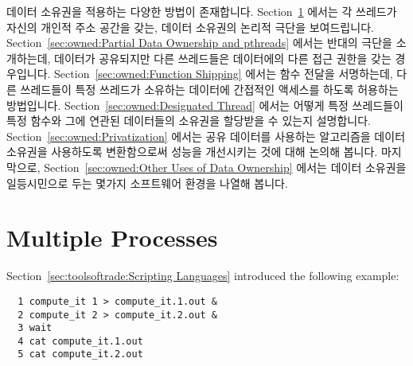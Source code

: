 데이터 소유권을 적용하는 다양한 방법이 존재합니다.
Section~\ref{sec:owned:Multiple Processes} 에서는 각 쓰레드가 자신의 개인적
주소 공간을 갖는, 데이터 소유권의 논리적 극단을 보여드립니다.
Section~\ref{sec:owned:Partial Data Ownership and pthreads} 에서는 반대의
극단을 소개하는데, 데이터가 공유되지만 다른 쓰레드들은 데이터에의 다른 접근
권한을 갖는 경우입니다.
Section~\ref{sec:owned:Function Shipping} 에서는 함수 전달을 서명하는데, 다른
쓰레드들이 특정 쓰레드가 소유하는 데이터에 간접적인 액세스를 하도록 허용하는
방법입니다.
Section~\ref{sec:owned:Designated Thread} 에서는 어떻게 특정 쓰레드들이 특정
함수와 그에 연관된 데이터들의 소유권을 할당받을 수 있는지 설명합니다.
Section~\ref{sec:owned:Privatization} 에서는 공유 데이터를 사용하는 알고리즘을
데이터 소유권을 사용하도록 변환함으로써 성능을 개선시키는 것에 대해 논의해
봅니다.
마지막으로, Section~\ref{sec:owned:Other Uses of Data Ownership} 에서는 데이터
소유권을 일등시민으로 두는 몇가지 소프트웨어 환경을 나열해 봅니다.
\iffalse

There are a number of approaches to data ownership.
Section~\ref{sec:owned:Multiple Processes} presents the logical extreme
in data ownership, where each thread has its own private address space.
Section~\ref{sec:owned:Partial Data Ownership and pthreads} looks at
the opposite extreme, where the data is shared, but different threads
own different access rights to the data.
Section~\ref{sec:owned:Function Shipping} describes function shipping,
which is a way of allowing other threads to have indirect access to
data owned by a particular thread.
Section~\ref{sec:owned:Designated Thread} describes how designated
threads can be assigned ownership of a specified function and the
related data.
Section~\ref{sec:owned:Privatization} discusses improving performance
by transforming algorithms with shared data to instead use data ownership.
Finally, Section~\ref{sec:owned:Other Uses of Data Ownership} lists
a few software environments that feature data ownership as a
first-class citizen.
\fi

\section{Multiple Processes}
\label{sec:owned:Multiple Processes}

Section~\ref{sec:toolsoftrade:Scripting Languages}
introduced the following example:

\vspace{5pt}
\begin{minipage}[t]{\columnwidth}
\scriptsize
\begin{verbatim}
  1 compute_it 1 > compute_it.1.out &
  2 compute_it 2 > compute_it.2.out &
  3 wait
  4 cat compute_it.1.out
  5 cat compute_it.2.out
\end{verbatim}
\end{minipage}
\vspace{5pt}

